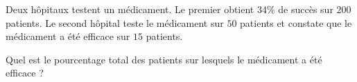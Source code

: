 
\begin{exercice}\label{exosmath-0957}

    Deux hôpitaux testent un médicament. Le premier obtient \( 34\%\) de succès sur \( 200\) patients. Le second hôpital teste le médicament sur \( 50\) patients et constate que le médicament a été efficace sur \( 15\) patients.

    Quel est le pourcentage total des patients sur lesquels le médicament a été efficace ?

\end{exercice}
